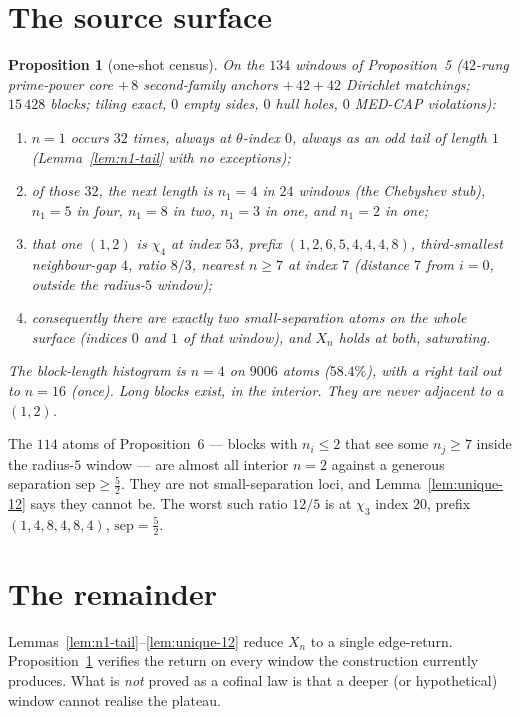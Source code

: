 \documentclass[11pt]{article}
\newtheorem{prop}{Proposition}
\theoremstyle{remark}
\begin{document}
\section{The source surface}\label{sec:census}

\begin{prop}[one-shot census]\label{prop:surface}
On the $134$ windows of \cite{medcap} Proposition~5
($42$-rung prime-power core $+\,8$ second-family anchors $+\,42+42$
Dirichlet matchings; $15\,428$ blocks; tiling exact, $0$ empty
sides, $0$ hull holes, $0$ MED-CAP violations):
\begin{enumerate}
\item $n=1$ occurs $32$ times, always at $\theta$-index $0$, always
as an odd tail of length $1$ (Lemma~\ref{lem:n1-tail} with no
exceptions);
\item of those $32$, the next length is $n_1=4$ in $24$ windows
(the Chebyshev stub), $n_1=5$ in four, $n_1=8$ in two, $n_1=3$ in
one, and $n_1=2$ in \emph{one};
\item that one $(1,2)$ is $\chi_4$ at index $53$, prefix
$(1,2,6,5,4,4,4,8)$, third-smallest neighbour-gap $4$, ratio
$8/3$, nearest $n\ge 7$ at index $7$ (distance $7$ from $i=0$,
outside the radius-$5$ window);
\item consequently there are exactly two small-separation atoms on
the whole surface (indices $0$ and $1$ of that window), and $X_n$
holds at both, saturating.
\end{enumerate}
The block-length histogram is $n=4$ on $9006$ atoms ($58.4\%$),
with a right tail out to $n=16$ (once).  Long blocks exist, in the
interior.  They are never adjacent to a $(1,2)$.
\end{prop}

The $114$ atoms of \cite{medcap} Proposition~6 --- blocks with
$n_i\le 2$ that see some $n_j\ge 7$ inside the radius-$5$ window ---
are almost all interior $n=2$ against a generous separation
$\mathrm{sep}\ge\tfrac52$.  They are not small-separation loci, and
Lemma~\ref{lem:unique-12} says they cannot be.  The worst such ratio
$12/5$ is at $\chi_3$ index $20$, prefix $(1,4,8,4,8,4)$,
$\mathrm{sep}=\tfrac52$.

\section{The remainder}\label{sec:remainder}

Lemmas~\ref{lem:n1-tail}--\ref{lem:unique-12} reduce $X_n$ to a
single edge-return.  Proposition~\ref{prop:surface} verifies the
return on every window the construction currently produces.  What
is \emph{not} proved as a cofinal law is that a deeper (or
hypothetical) window cannot realise the plateau.
\end{document}
